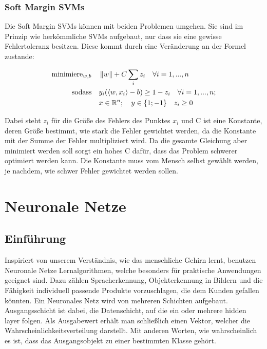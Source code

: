 \subsubsection{Soft Margin SVMs}
Die Soft Margin SVMs können mit beiden Problemen umgehen.
Sie sind im Prinzip wie herkömmliche SVMs aufgebaut, nur dass sie eine gewisse Fehlertoleranz besitzen. Diese kommt durch eine Veränderung an der Formel zustande:

\begin{align*}
	\operatorname{minimiere}_{w,b} \quad & \left\lVert w\right\rVert + C\sum_{i}{z_{i}} \quad \forall i = 1,...,n \\
	\operatorname{sodass} \quad & y_{i}(\langle w,x_{i} \rangle - b) \geq 1 - z_{i} \quad \forall i = 1,...,n; \\ 
	&x \in \mathbb{R}^n; \quad y \in \{1; -1\} \quad z_{i} \geq 0 \\
\end{align*}

Dabei steht $z_{i}$ für die Größe des Fehlers des Punktes $x_{i}$ und C ist eine Konstante, deren Größe bestimmt, wie stark die Fehler gewichtet werden, da die Konstante mit der Summe der Fehler multipliziert wird. Da die gesamte Gleichung aber minimiert werden soll sorgt ein hohes C dafür, dass das Problem schwerer optimiert werden kann. Die Konstante muss vom Mensch selbst gewählt werden, je nachdem, wie schwer Fehler gewichtet werden sollen.

\section{Neuronale Netze}
\author {Farhadiba Mohammed}

\subsection{Einführung}

Inspiriert von unserem Verständnis, wie das menschliche Gehirn lernt, benutzen Neuronale Netze Lernalgorithmen, welche besonders für praktische Anwendungen geeignet sind.
Dazu zählen Spracherkennung, Objekterkennung in Bildern und die Fähigkeit individuell passende Produkte vorzuschlagen, die dem Kunden gefallen könnten. 
Ein Neuronales Netz wird von mehreren Schichten aufgebaut. Ausgangsschicht ist dabei, die Datenschicht, auf die ein oder mehrere hidden layer folgen. Als Ausgabewert erhält man schließlich einen Vektor, welcher die Wahrscheinlichkeitsverteilung darstellt. Mit anderen Worten, wie wahrscheinlich es ist, dass das Ausgangsobjekt zu einer bestimmten Klasse gehört.

